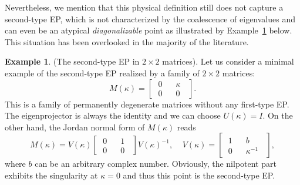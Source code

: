 \documentclass{tADP2e}
\theoremstyle{plain}
\theoremstyle{plain}
\theoremstyle{definition}
\newtheorem{example}{Example}[section]
\newcommand{\exmp}[1]{
\begin{example}
	#1
\end{example}
}
\begin{document}
Nevertheless, we mention that this physical definition still does not capture a second-type EP, which is not characterized by the coalescence of eigenvalues and can even be an atypical \emph{diagonalizable} point as illustrated by Example~\ref{Ex:2EP} below. This situation has been overlooked in the majority of the literature. 

\exmp{(The second-type EP in $2\times 2$ matrices).
\label{Ex:2EP}
Let us consider a minimal example of the second-type EP realized by a family of $2\times2$ matrices:
\begin{equation}
M(\kappa)=\begin{bmatrix}  \;0\; &  \;\;\kappa\;\; \\ \;0\; & \;\;0\;\; \end{bmatrix}.
\label{exstep}
\end{equation}
This is a family of permanently degenerate matrices without any first-type EP. The eigenprojector is always the identity and we can choose $U(\kappa)=I$. On the other hand, the Jordan normal form of $M(\kappa)$ reads
\begin{equation}
M(\kappa)=V(\kappa)\begin{bmatrix} \;0\; & \;\;1\;\; \\ \;0\; & \;\;0\;\; \end{bmatrix} V(\kappa)^{-1},\;\;\;\;
V(\kappa)=\begin{bmatrix} \;1\; & \;\;b\;\; \\ \;0\; & \;\;\kappa^{-1}\;\; \end{bmatrix},
\end{equation}
where $b$ can be an arbitrary complex number. Obviously, the nilpotent part exhibits the singularity at $\kappa=0$ and thus this point is the second-type EP.
}
\end{document}
